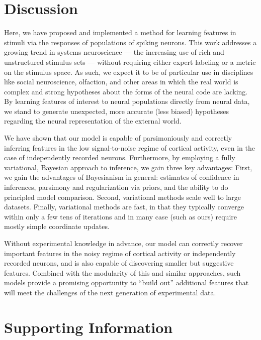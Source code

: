\documentclass[10pt,letterpaper]{article}
\begin{document}
\section*{Discussion}

Here, we have proposed and implemented a method for learning features in stimuli via the responses of populations of spiking neurons. This work addresses a growing trend in systems neuroscience --- the increasing use of rich and unstructured stimulus sets --- without requiring either expert labeling or a metric on the stimulus space. As such, we expect it to be of particular use in disciplines like social neuroscience, olfaction, and other areas in which the real world is complex and strong hypotheses about the forms of the neural code are lacking. By learning features of interest to neural populations directly from neural data, we stand to generate unexpected, more accurate (less biased) hypotheses regarding the neural representation of the external world.

We have shown that our model is capable of parsimoniously and correctly inferring features in the low signal-to-noise regime of cortical activity, even in the case of independently recorded neurons. Furthermore, by employing a fully variational, Bayesian approach to inference, we gain three key advantages: First, we gain the advantages of Bayesianism in general: estimates of confidence in inferences, parsimony and regularization via priors, and the ability to do principled model comparison. Second, variational methods scale well to large datasets. Finally, variational methods are fast, in that they typically converge within only a few tens of iterations and in many case (such as ours) require mostly simple coordinate updates.

Without experimental knowledge in advance, our model can correctly recover important features in the noisy regime of cortical activity or independently recorded neurons, and is also capable of discovering smaller but suggestive features. Combined with the modularity of this and similar approaches, such models provide a promising opportunity to ``build out'' additional features that will meet the challenges of the next generation of experimental data.





\section*{Supporting Information}
\end{document}
